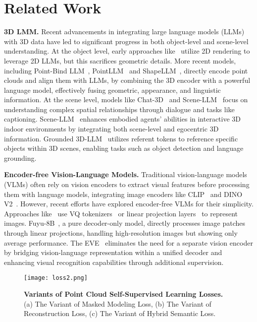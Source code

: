 \section{Related Work}
\textbf{3D LMM.} 
Recent advancements in integrating large language models (LLMs) with 3D data have led to significant progress in both object-level and scene-level understanding.
At the object level, early approaches like~\cite{hong20243d} utilize 2D rendering to leverage 2D LLMs, but this sacrifices geometric details. More recent models, including Point-Bind LLM~\cite{guo2023point}, PointLLM~\cite{xu2023pointllm} and ShapeLLM~\cite{qi2024shapellm}, directly encode point clouds and align them with LLMs, by combining the 3D encoder with a powerful language model, effectively fusing geometric, appearance, and linguistic information.
At the scene level, models like Chat-3D~\cite{chat3d} and Scene-LLM~\cite{scenellm} focus on understanding complex spatial relationships through dialogue and tasks like captioning. 
Scene-LLM~\cite{scenellm} enhances embodied agents' abilities in interactive 3D indoor environments by integrating both scene-level and egocentric 3D information.
Grounded 3D-LLM~\cite{chen2024grounded} utilizes referent tokens to reference specific objects within 3D scenes, enabling tasks such as object detection and language grounding.

\textbf{Encoder-free Vision-Language Models.} 
Traditional vision-language models (VLMs) often rely on vision encoders to extract visual features before processing them with language models, integrating image encoders like CLIP~\cite{VLP:CLIP} and DINO V2~\cite{oquab2023dinov2}. 
However, recent efforts have explored encoder-free VLMs for their simplicity. 
Approaches like~\cite{team2024chameleon, xie2024show} use VQ tokenizers~\cite{vqgan} or linear projection layers~\cite{diao2024EVE, solo} to represent images.
Fuyu-8B~\cite{VLM:Fuyu-8b}, a pure decoder-only model, directly processes image patches through linear projections, handling high-resolution images but showing only average performance. 
The EVE~\cite{diao2024unveiling} eliminates the need for a separate vision encoder by bridging vision-language representation within a unified decoder and enhancing visual recognition capabilities through additional supervision.


\begin{figure}[!h]
\centering
\texttt{[image: loss2.png]}
\vspace{-0.2cm}
\caption{\textbf{Variants of Point Cloud Self-Supervised Learning Losses.} 
(a) The Variant of Masked Modeling Loss, (b) The Variant of Reconstruction Loss, (c) The Variant of Hybrid Semantic Loss.}
  \label{loss2}
\end{figure}